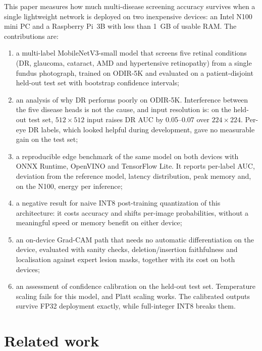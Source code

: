 \documentclass[a4paper,fleqn]{cas-sc}
\begin{document}
This paper measures how much multi-disease screening accuracy survives when
a single lightweight network is deployed on two inexpensive devices: an
Intel N100 mini PC and a Raspberry Pi~3B with less than 1~GB of usable RAM.
The contributions are:
\begin{enumerate}[(1)]
\item a multi-label MobileNetV3-small model that screens five retinal
  conditions (DR, glaucoma, cataract, AMD and hypertensive retinopathy)
  from a single fundus photograph, trained on ODIR-5K and evaluated on a
  patient-disjoint held-out test set with bootstrap confidence intervals;
\item an analysis of why DR performs poorly on ODIR-5K. Interference between
  the five disease heads is not the cause, and input resolution is: on the
  held-out test set, $512\times512$ input raises DR AUC by 0.05--0.07 over
  $224\times224$. Per-eye DR labels, which looked helpful during
  development, gave no measurable gain on the test set;
\item a reproducible edge benchmark of the same model on both devices with
  ONNX Runtime, OpenVINO and TensorFlow Lite. It reports per-label AUC,
  deviation from the reference model, latency distribution, peak memory and, on the N100, energy per
  inference;
\item a negative result for naive INT8 post-training quantization of this
  architecture: it costs accuracy and shifts per-image probabilities,
  without a meaningful speed or memory benefit on either device;
\item an on-device Grad-CAM path that needs no automatic differentiation on
  the device, evaluated with sanity checks, deletion/insertion
  faithfulness and localisation against expert lesion masks, together with
  its cost on both devices;
\item an assessment of confidence calibration on the held-out test set.
  Temperature scaling fails for this model, and Platt scaling works. The
  calibrated outputs survive FP32 deployment exactly, while full-integer
  INT8 breaks them.
\end{enumerate}

\section{Related work}
\label{sec:related}
\end{document}
